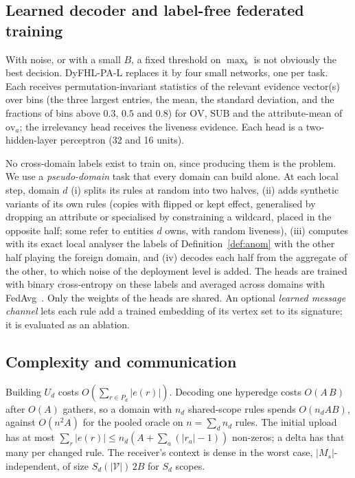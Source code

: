 \documentclass[preprint,12pt]{elsarticle}
\theoremstyle{definition}
\newcommand{\name}{DyFHL-PA\xspace}
\begin{document}
\subsection{Learned decoder and label-free federated training}
\label{sec:learn}
With noise, or with a small $B$, a fixed threshold on $\max_b$ is not obviously the best decision. \name-L replaces it by four small networks, one per task. Each receives permutation-invariant statistics of the relevant evidence vector(s) over bins (the three largest entries, the mean, the standard deviation, and the fractions of bins above $0.3$, $0.5$ and $0.8$) for $\mathrm{OV}$, $\mathrm{SUB}$ and the attribute-mean of $\mathrm{ov}_a$; the irrelevancy head receives the liveness evidence. Each head is a two-hidden-layer perceptron (32 and 16 units).

No cross-domain labels exist to train on, since producing them is the problem. We use a \emph{pseudo-domain} task that every domain can build alone. At each local step, domain $d$ (i) splits its rules at random into two halves, (ii) adds synthetic variants of its own rules (copies with flipped or kept effect, generalised by dropping an attribute or specialised by constraining a wildcard, placed in the opposite half; some refer to entities $d$ owns, with random liveness), (iii) computes with its exact local analyser the labels of Definition~\ref{def:anom} with the other half playing the foreign domain, and (iv) decodes each half from the aggregate of the other, to which noise of the deployment level is added. The heads are trained with binary cross-entropy on these labels and averaged across domains with FedAvg~\cite{mcmahan2017communication}. Only the weights of the heads are shared. An optional \emph{learned message channel} lets each rule add a trained embedding of its vertex set to its signature; it is evaluated as an ablation.

\subsection{Complexity and communication}
Building $U_d$ costs $O(\sum_{r\in P_d}|e(r)|)$. Decoding one hyperedge costs $O(A\,B)$ after $O(A)$ gathers, so a domain with $n_d$ shared-scope rules spends $O(n_d A B)$, against $O(n^2A)$ for the pooled oracle on $n=\sum_d n_d$ rules. The initial upload has at most $\sum_r|e(r)|\le n_d(A+\sum_a(|r_a|-1))$ non-zeros; a delta has that many per changed rule. The receiver's context is dense in the worst case, $|M_s|$-independent, of size $S_d(|\mathcal V|)\,2B$ for $S_d$ scopes.
\end{document}
